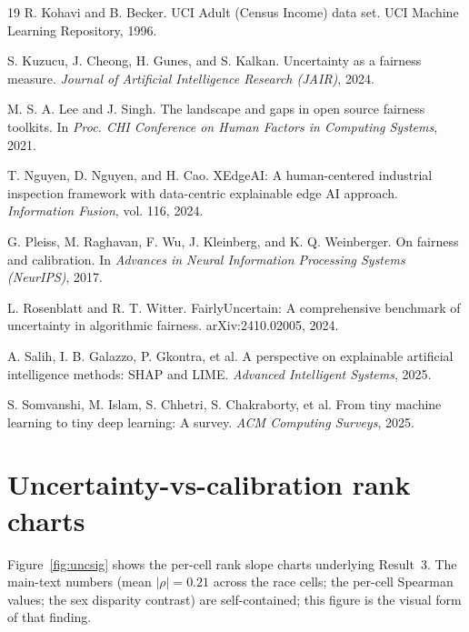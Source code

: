 \documentclass{article}
\begin{document}
\begin{thebibliography}{19}
R. Kohavi and B. Becker.
\newblock UCI Adult (Census Income) data set.
\newblock UCI Machine Learning Repository, 1996.

S. Kuzucu, J. Cheong, H. Gunes, and S. Kalkan.
\newblock Uncertainty as a fairness measure.
\newblock \emph{Journal of Artificial Intelligence Research (JAIR)}, 2024.

M. S. A. Lee and J. Singh.
\newblock The landscape and gaps in open source fairness toolkits.
\newblock In \emph{Proc. CHI Conference on Human Factors in Computing Systems}, 2021.

T. Nguyen, D. Nguyen, and H. Cao.
\newblock XEdgeAI: A human-centered industrial inspection framework with data-centric explainable edge AI approach.
\newblock \emph{Information Fusion}, vol. 116, 2024.

G. Pleiss, M. Raghavan, F. Wu, J. Kleinberg, and K. Q. Weinberger.
\newblock On fairness and calibration.
\newblock In \emph{Advances in Neural Information Processing Systems (NeurIPS)}, 2017.

L. Rosenblatt and R. T. Witter.
\newblock FairlyUncertain: A comprehensive benchmark of uncertainty in algorithmic fairness.
\newblock arXiv:2410.02005, 2024.

A. Salih, I. B. Galazzo, P. Gkontra, et al.
\newblock A perspective on explainable artificial intelligence methods: SHAP and LIME.
\newblock \emph{Advanced Intelligent Systems}, 2025.

S. Somvanshi, M. Islam, S. Chhetri, S. Chakraborty, et al.
\newblock From tiny machine learning to tiny deep learning: A survey.
\newblock \emph{ACM Computing Surveys}, 2025.

\end{thebibliography}

\appendix

\section{Uncertainty-vs-calibration rank charts}
\label{app:uncsig}

Figure~\ref{fig:uncsig} shows the per-cell rank slope charts underlying Result~3. The main-text numbers (mean $|\rho| = 0.21$ across the race cells; the per-cell Spearman values; the sex disparity contrast) are self-contained; this figure is the visual form of that finding.
\end{document}
